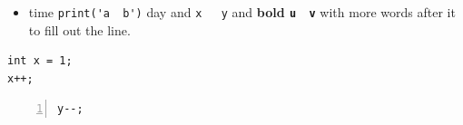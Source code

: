 \documentclass[11pt]{article}
\begin{document}
\begin{itemize}
\item {\color{blue} time \lstinline{print('a  b')} day} and {\small \lstinline{x   y}} and
\textbf{bold \lstinline{u  v}} with more words after it to fill out the line.
\end{itemize}
\begin{lstlisting}[numbers=right,numbersep=1em,numberstyle=\footnotesize,basicstyle=\ttfamily]
int x = 1;
x++;
\end{lstlisting}
\begin{lstlisting}[numbers=left,numbersep=1.5em,numberstyle=\tiny,basicstyle=\small\ttfamily]
y--;
\end{lstlisting}
\end{document}
